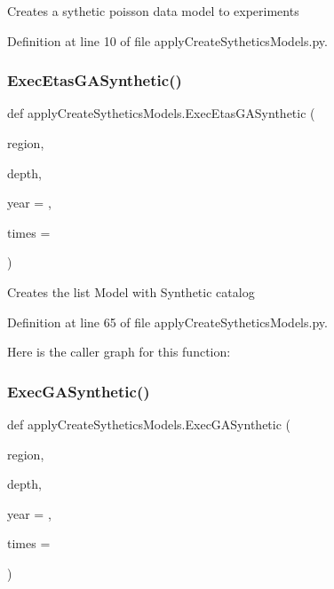 \begin{DoxyVerb}Creates a sythetic poisson data model to experiments
\end{DoxyVerb}
 

Definition at line 10 of file apply\+Create\+Sythetics\+Models.\+py.

\mbox{\label{namespaceapply_create_sythetics_models_a1a1737fcb775e89cc32c84acc1c21136}} 
\subsubsection{\texorpdfstring{Exec\+Etas\+G\+A\+Synthetic()}{ExecEtasGASynthetic()}}
{\footnotesize\ttfamily def apply\+Create\+Sythetics\+Models.\+Exec\+Etas\+G\+A\+Synthetic (\begin{DoxyParamCaption}\item[{}]{region,  }\item[{}]{depth,  }\item[{}]{year = {},  }\item[{}]{times = {} }\end{DoxyParamCaption})}

\begin{DoxyVerb}Creates the list Model with Synthetic catalog
\end{DoxyVerb}
 

Definition at line 65 of file apply\+Create\+Sythetics\+Models.\+py.

Here is the caller graph for this function\+:
\mbox{\label{namespaceapply_create_sythetics_models_a6bf131fedd356ab73e3ab5068c2b4f2c}} 
\subsubsection{\texorpdfstring{Exec\+G\+A\+Synthetic()}{ExecGASynthetic()}}
{\footnotesize\ttfamily def apply\+Create\+Sythetics\+Models.\+Exec\+G\+A\+Synthetic (\begin{DoxyParamCaption}\item[{}]{region,  }\item[{}]{depth,  }\item[{}]{year = {},  }\item[{}]{times = {} }\end{DoxyParamCaption})}

